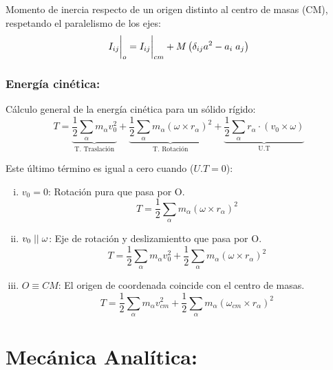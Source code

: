 \documentclass[14pt]{extarticle}
\begin{document}
			Momento de inercia respecto de un origen distinto al centro de masas (CM), respetando el paralelismo de los ejes:
			\begin{equation}
				I_{ij}\biggr|_o = I_{ij}\biggr| _{cm} + M\left(\delta_{ij}a^2 - a_i \hspace*{1mm} a_j \right)
			\end{equation}

	\section{Energía cinética:}

		Cálculo general de la energía cinética para un sólido rígido:
		\begin{equation}[i]
		 	T = \underbrace{\frac{1}{2} \sum_\alpha m_\alpha v^2_0}_{\text{T. Traslación}} + \underbrace{\frac{1}{2} \sum_\alpha m_\alpha \left( \omega \times r_\alpha \right)^2}_{\text{T. Rotación}} + \underbrace{\frac{1}{2} \sum_\alpha r_\alpha \cdot \left( v_0 \times \omega \right)}_\text{{U.T}}
		\end{equation}

		Este último término es igual a cero cuando ($U.T = 0$):
		\begin{enumerate}[(i)]
			\item{
				$v_0 = 0$: Rotación pura que pasa por O. 
				\begin{equation}
					T = \frac{1}{2} \sum_\alpha m_\alpha \left( \omega \times r_\alpha \right)^2
				\end{equation}
			}
			\item{
				$v_0 \hspace{1mm} || \hspace{1mm} \omega$: Eje de rotación y deslizamientto que pasa por O.
				\begin{equation}
					T = \frac{1}{2} \sum_\alpha m_\alpha v^2_0 + \frac{1}{2} \sum_\alpha m_\alpha \left( \omega \times r_\alpha \right)^2
				\end{equation}
			}
			\item{
				$O \equiv CM$: El origen de coordenada coincide con el centro de masas.
				\begin{equation}
					T = \frac{1}{2} \sum_\alpha m_\alpha v^2_{cm} + \frac{1}{2} \sum_\alpha m_\alpha \left( \omega_{cm} \times r_\alpha \right)^2
				\end{equation}
			}
		\end{enumerate}



\clearpage
\part{Mecánica Analítica:}
	
\end{document}
